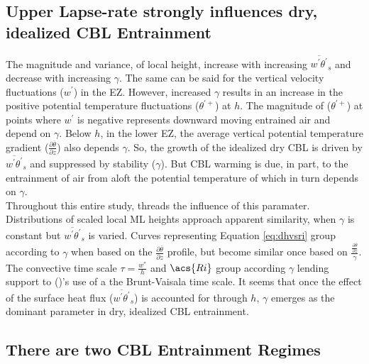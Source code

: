 \subsection{Upper Lapse-rate strongly influences dry, idealized \acs{CBL} Entrainment}

The magnitude and variance, of local height, increase with increasing $\overline{w^{'}\theta^{'}}_{s}$ and decrease with increasing $\gamma$.  The same can be said for the vertical velocity fluctuations ($w^{'}$) in the \acs{EZ}.  However, increased $\gamma$ results in an increase in the positive potential temperature fluctuations ($\theta^{'+}$) at $h$. The magnitude of ($\theta^{'+}$) at points where $w^{'}$ is negative represents downward moving entrained air and depend on $\gamma$.  Below $h$, in the lower \acs{EZ}, the average vertical potential temperature gradient ($\frac{\partial \overline{\theta}}{\partial z}$) also depends $\gamma$. So, the growth of the idealized dry \acs{CBL} is driven by $\overline{w^{'}\theta^{'}}_{s}$ and suppressed by stability ($\gamma$). But \acs{CBL} warming is due, in part, to the entrainment of air from aloft the potential temperature of which in turn depends on $\gamma$.\\

Throughout this entire study, threads the influence of this paramater.  Distributions of scaled local \acs{ML} heights approach apparent similarity, when $\gamma$ is constant but $\overline{w^{'}\theta^{'}}_{s}$ is varied.  Curves representing Equation \ref{eq:dhvsri} group according to $\gamma$ when based on the $\frac{\partial \overline{\theta}}{\partial z}$ profile, but become similar once based on $\frac{\frac{\partial \overline{\theta}}{\partial z}}{\gamma}$.  The convective time scale $\tau = \frac{w^{*}}{h}$ and $\acs{Ri}$ group according $\gamma$ lending support to \citeauthor{FedConzMir04} (\citeyear{FedConzMir04})'s use of a the Brunt-Vaisala time scale.  It seems that once the effect of the surface heat flux ($\overline{w^{'}\theta^{'}}_{s}$) is accounted for through $h$, $\gamma$ emerges as the dominant parameter in dry, idealized \acs{CBL} entrainment.\\ 

\subsection{There are two \acs{CBL} Entrainment Regimes}

